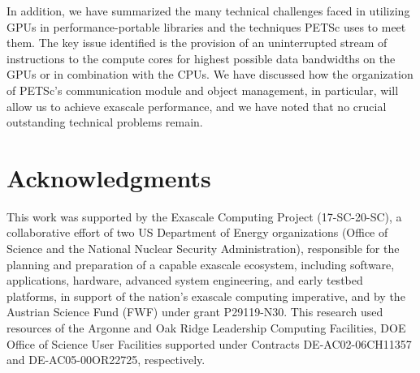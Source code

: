 \documentclass[10pt,journal,compsoc]{IEEEtran}
\begin{document}
In addition, we have summarized the many technical
challenges faced in utilizing GPUs in performance-portable libraries and the techniques PETSc uses to meet them.
The key issue identified is the provision of an uninterrupted stream of instructions to the compute cores for highest possible data
bandwidths on the GPUs or in combination with the CPUs. We have discussed how the organization of PETSc's communication module
and object management, in particular, will allow us to achieve exascale performance, and we have noted that no crucial outstanding technical problems remain.


\section*{Acknowledgments}
\noindent
This work was supported by the Exascale Computing Project (17-SC-20-SC), a collaborative 
effort of two US Department of Energy organizations (Office of Science and the National
Nuclear Security Administration), responsible for the planning and preparation
of a capable exascale ecosystem, including software, applications, hardware,
advanced system engineering, and early testbed platforms, in support of the
nation’s exascale computing imperative, and by the Austrian Science Fund (FWF) under grant P29119-N30.  This research used resources of the 
Argonne and Oak Ridge Leadership Computing Facilities, DOE Office of Science 
User Facilities supported under Contracts DE-AC02-06CH11357 and 
DE-AC05-00OR22725, respectively.



\end{document}

